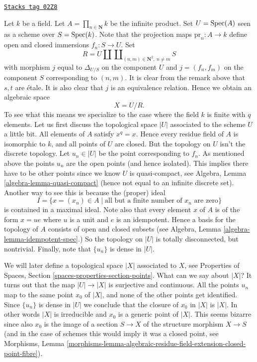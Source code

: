 \begin{example}
\label{spaces-example-infinite-product}
\href{https://stacks.math.columbia.edu/tag/02Z8}{\texttt{Stacks tag 02Z8}}

Let $k$ be a field.
Let $A = \prod_{n \in \mathbf{N}} k$ be the infinite product.
Set $U = \operatorname{Spec}(A)$ seen as a scheme over $S = \operatorname{Spec}(k)$.
Note that the projection maps $\text{pr}_n : A \to k$ define open
and closed immersions $f_n : S \to U$. Set
$$
R = U \amalg \coprod\nolimits_{(n, m) \in \mathbf{N}^2, \ n \not = m} S
$$
with morphism $j$ equal to $\Delta_{U/S}$ on the component $U$
and $j = (f_n, f_m)$ on the component $S$ corresponding to $(n, m)$.
It is clear from the remark above that $s, t$ are \'etale.
It is also clear that $j$ is an equivalence relation. Hence we
obtain an algebraic space
$$
X = U/R.
$$
To see what this means we specialize to the case where
the field $k$ is finite with $q$ elements. Let us first
discuss the topological space $|U|$ associated to the scheme $U$
a little bit. All elements of $A$ satisfy $x^q = x$.
Hence every residue field of $A$ is isomorphic to $k$, and
all points of $U$ are closed. But the topology on $U$ isn't
the discrete topology. Let $u_n \in |U|$ be the point corresponding
to $f_n$. As mentioned above the points $u_n$ are
the open points (and hence isolated). This implies there have
to be other points since we know $U$ is quasi-compact, see
Algebra, Lemma \ref{algebra-lemma-quasi-compact}
(hence not equal to an infinite discrete set).
Another way to see this is because the (proper) ideal
$$
I =
\{x = (x_n) \in A \mid \text{all but a finite number of }x_n\text{ are zero}\}
$$
is contained in a maximal ideal. Note also that every element
$x$ of $A$ is of the form $x = ue$ where $u$ is a unit and $e$ is an
idempotent. Hence a basis for the topology of $A$ consists of open and
closed subsets (see Algebra, Lemma \ref{algebra-lemma-idempotent-spec}.)
So the topology on $|U|$ is totally disconnected, but nontrivial.
Finally, note that $\{u_n\}$ is dense in $|U|$.

\medskip\noindent
We will later define a topological space $|X|$ associated to $X$, see
Properties of Spaces, Section \ref{spaces-properties-section-points}.
What can we say about $|X|$?
It turns out that the map $|U| \to |X|$ is surjective and continuous.
All the points $u_n$ map to the same point $x_0$ of $|X|$, and none of
the other points get identified. Since $\{u_n\}$ is dense in $|U|$ we
conclude that the closure of $x_0$ in $|X|$ is $|X|$. In other words
$|X|$ is irreducible and $x_0$ is a generic point of $|X|$. This seems
bizarre since also $x_0$ is the image of a section
$S \to X$ of the structure morphism $X \to S$ (and in the case of
schemes this would imply it was a closed point, see
Morphisms, Lemma
\ref{morphisms-lemma-algebraic-residue-field-extension-closed-point-fibre}).
\end{example}

